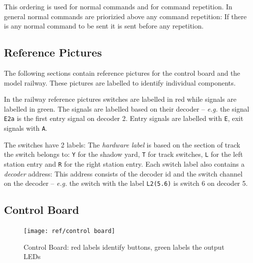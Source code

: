\documentclass{scrreprt}
\newcommand\eg{\emph{e.g. }}
\newcommand{\code}[1]{\texttt{#1}}
\begin{document}
This ordering is used for normal commands and for command repetition.
In general normal commands are priorizied above any command repetition:
If there is any normal command to be sent it is sent before any repetition.

\begin{appendices}
\chapter{Reference Pictures}
The following sections contain reference pictures for the control board and the model railway.
These pictures are labelled to identify individual components.

In the railway reference pictures switches are labelled in red while signals are labelled in green.
The signals are labelled based on their decoder -- \eg the signal \code{E2a} is the first entry signal on decoder 2.
Entry signals are labelled with \code{E}, exit signals with \code{A}.

The switches have 2 labels:
The \emph{hardware label} is based on the section of track the switch belongs to:
\code{Y} for the shadow yard, \code{T} for track switches, \code{L} for the left station entry and \code{R} for the right station entry.
Each switch label also contains a \emph{decoder} address:
This address consists of the decoder id and the switch channel on the decoder -- \eg the switch with the label \code{L2(5.6)} is switch 6 on decoder 5.

\pagebreak
\section{Control Board}
\begin{figure}[h!]
    \centering
    \texttt{[image: ref/control board]}
    \caption{Control Board: red labels identify buttons, green labels the output LEDs }
\end{figure}


\end{appendices}
\end{document}

